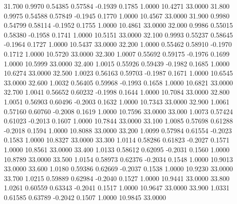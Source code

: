   31.700   0.9970   0.54385   0.57584  -0.1939   0.1785   1.0000  10.4271  33.0000
  31.800   0.9975   0.54588   0.57849  -0.1945   0.1770   1.0000  10.4567  33.0000
  31.900   0.9980   0.54799   0.58114  -0.1952   0.1755   1.0000  10.4861  33.0000
  32.000   0.9986   0.55015   0.58380  -0.1958   0.1741   1.0000  10.5151  33.0000
  32.100   0.9993   0.55237   0.58645  -0.1964   0.1727   1.0000  10.5437  33.0000
  32.200   1.0000   0.55462   0.58910  -0.1970   0.1712   1.0000  10.5720  33.0000
  32.300   1.0007   0.55692   0.59175  -0.1976   0.1699   1.0000  10.5999  33.0000
  32.400   1.0015   0.55926   0.59439  -0.1982   0.1685   1.0000  10.6274  33.0000
  32.500   1.0023   0.56163   0.59703  -0.1987   0.1671   1.0000  10.6545  33.0000
  32.600   1.0032   0.56405   0.59968  -0.1993   0.1658   1.0000  10.6821  33.0000
  32.700   1.0041   0.56652   0.60232  -0.1998   0.1644   1.0000  10.7084  33.0000
  32.800   1.0051   0.56903   0.60496  -0.2003   0.1632   1.0000  10.7343  33.0000
  32.900   1.0061   0.57160   0.60760  -0.2008   0.1619   1.0000  10.7596  33.0000
  33.000   1.0073   0.57424   0.61023  -0.2013   0.1607   1.0000  10.7844  33.0000
  33.100   1.0085   0.57698   0.61288  -0.2018   0.1594   1.0000  10.8088  33.0000
  33.200   1.0099   0.57984   0.61554  -0.2023   0.1583   1.0000  10.8327  33.0000
  33.300   1.0114   0.58286   0.61823  -0.2027   0.1571   1.0000  10.8561  33.0000
  33.400   1.0133   0.58612   0.62095  -0.2031   0.1560   1.0000  10.8789  33.0000
  33.500   1.0154   0.58973   0.62376  -0.2034   0.1548   1.0000  10.9013  33.0000
  33.600   1.0180   0.59386   0.62669  -0.2037   0.1538   1.0000  10.9230  33.0000
  33.700   1.0215   0.59889   0.62984  -0.2040   0.1527   1.0000  10.9441  33.0000
  33.800   1.0261   0.60559   0.63343  -0.2041   0.1517   1.0000  10.9647  33.0000
  33.900   1.0331   0.61585   0.63789  -0.2042   0.1507   1.0000  10.9845  33.0000
